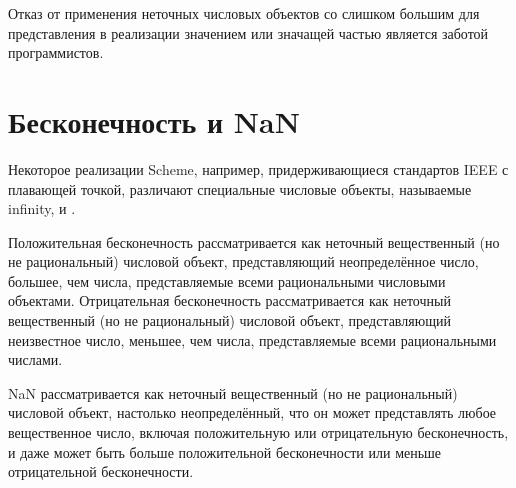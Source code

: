 Отказ от применения неточных числовых объектов со слишком большим для представления в
реализации значением или значащей частью является заботой программистов.\vspace{-6mm}

\section{Бесконечность и NaN}

Некоторое реализации Scheme, например, придерживающиеся стандартов IEEE с плавающей
точкой, различают специальные числовые объекты, называемые \mainindex
{infinity},  и
.

Положительная бесконечность рассматривается как неточный вещественный (но не рациональный)
числовой объект, представляющий неопределённое число, большее, чем числа, представляемые всеми
рациональными числовыми объектами. Отрицательная бесконечность рассматривается как неточный
вещественный (но не рациональный) числовой объект, представляющий неизвестное число, меньшее,
чем числа, представляемые всеми рациональными числами.

NaN рассматривается как неточный вещественный (но не рациональный) числовой объект, настолько
неопределённый, что он может представлять любое вещественное число, включая положительную или
отрицательную бесконечность, и даже может быть больше положительной бесконечности или
меньше отрицательной бесконечности.\vspace{-5mm}

